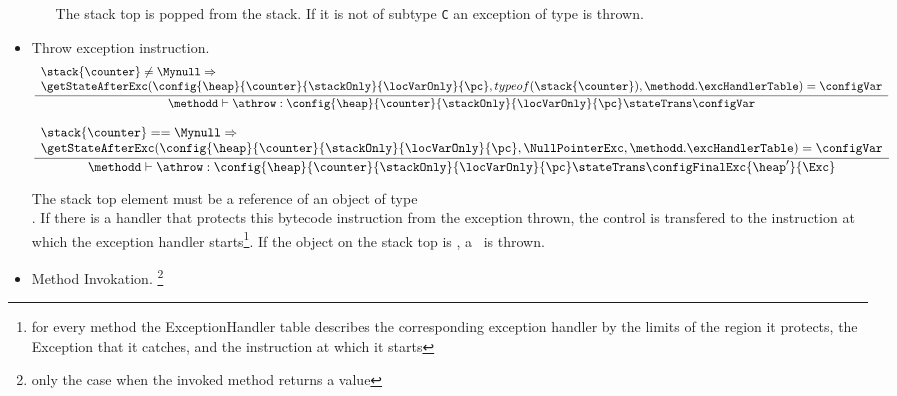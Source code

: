 \begin{itemize}
\begin{enumerate}
	   The stack top is popped from the stack. If it is not of subtype \texttt{C} an exception of type \ClassCastExc is thrown.

	 
   \end{enumerate}

   \item Throw exception instruction. \athrow
            $$ \frac{ \begin{array}{l}	 
		             \stack{\counter} \neq \Mynull \Rightarrow\\
			     \getStateAfterExc( \config{\heap}{\counter}{\stackOnly}{\locVarOnly}{\pc},typeof( \stack{\counter} )  ,\methodd.\excHandlerTable ) =  \configVar
		    \end{array}	     
	      }
              {\methodd \vdash \athrow :  \config{\heap}{\counter}{\stackOnly}{\locVarOnly}{\pc} 
		                         \stateTrans  
					 \configVar}$$

	     $$ \frac{ \begin{array}{l}	 
	                     \stack{\counter}  == \Mynull \Rightarrow \\
			     \getStateAfterExc( \config{\heap}{\counter}{\stackOnly}{\locVarOnly}{\pc}, \NullPointerExc  ,\methodd.\excHandlerTable ) =  \configVar
      		    \end{array}	     
	      }
              {\methodd \vdash \athrow :  \config{\heap}{\counter}{\stackOnly}{\locVarOnly}{\pc} 
		                         \stateTrans  
					 \configFinalExc{\heap' }{\Exc}}$$ 				 

           The stack top element  must be a reference of an object of type \\ \Throwable. 
	  If there is a handler that protects this bytecode instruction from the exception thrown, the control is transfered
	  to the instruction at which the exception handler starts\footnote{for every method the ExceptionHandler
	  table describes the corresponding exception handler by the limits of the 
	  region it protects, the Exception that it catches, and the instruction at which it starts}.
	  If the object on the stack top is \Mynull, a \NullPointerExc \ is thrown. 

 \item Method Invokation. \invoke \footnote{ only the case when  the invoked method returns a value}
      

\end{itemize}
